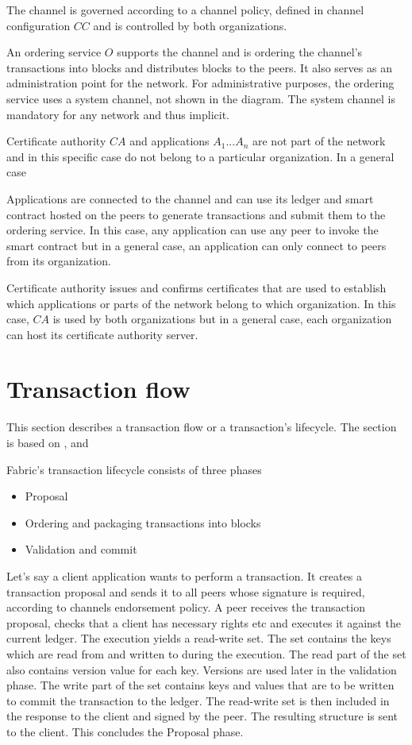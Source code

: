 The channel is governed according to a channel policy, defined in channel configuration $CC$ and is controlled by both organizations.

An ordering service $O$ supports the channel and is ordering the channel's transactions into blocks and distributes blocks to the peers. It also serves as an administration point for the network. For administrative purposes, the ordering service uses a system channel, not shown in the diagram. The system channel is mandatory for any network and thus implicit.

Certificate authority $CA$ and applications $A_{1} ... A_{n}$ are not part of the network and in this specific case do not belong to a particular organization. In a general case

Applications are connected to the channel and can use its ledger and smart contract hosted on the peers to generate transactions and submit them to the ordering service. In this case, any application can use any peer to invoke the smart contract but in a general case, an application can only connect to peers from its organization.

Certificate authority issues and confirms certificates that are used to establish which applications or parts of the network belong to which organization. In this case, $CA$ is used by both organizations but in a general case, each organization can host its certificate authority server.

\newpage

\section{Transaction flow}
\label{section:flow}
This section describes a transaction flow or a transaction's lifecycle. The section is based on \cite{fabricdocs:flow},  \cite{fabricdocs:peer} and \cite{fabricdocs:orderer}

Fabric's transaction lifecycle consists of three phases
\begin{itemize}
  \item Proposal
  \item Ordering and packaging transactions into blocks
  \item Validation and commit
\end{itemize}

Let's say a client application wants to perform a transaction. It creates a transaction proposal and sends it to all peers whose signature is required, according to channels endorsement policy.
A peer receives the transaction proposal, checks that a client has necessary rights etc and executes it against the current ledger. The execution yields a read-write set. The set contains the keys which are read from and written to during the execution. The read part of the set also contains version value for each key. Versions are used later in the validation phase. The write part of the set contains keys and values that are to be written to commit the transaction to the ledger. The read-write set is then included in the response to the client and signed by the peer. The resulting structure is sent to the client. This concludes the Proposal phase.

